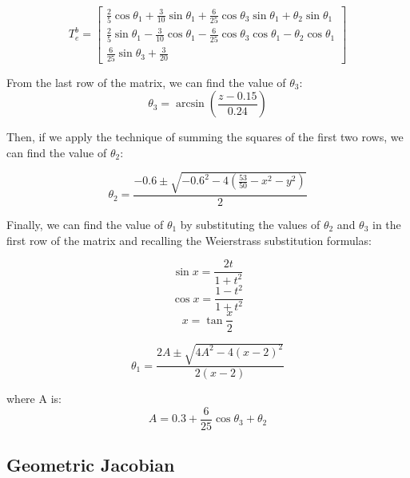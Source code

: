 \documentclass{article}
\begin{document}
\begin{equation}
    \renewcommand{\arraystretch}{1.5}
    T_e ^b =
    \begin{bmatrix}
        \frac{2}{5} \cos \theta_1 + \frac{3}{10} \sin \theta_1 + \frac{6}{25} \cos \theta_3 \sin \theta_1 + \theta_2 \sin \theta_1 \\
        \frac{2}{5} \sin \theta_1 - \frac{3}{10} \cos \theta_1 - \frac{6}{25} \cos \theta_3 \cos \theta_1 - \theta_2 \cos \theta_1 \\
        \frac{6}{25} \sin \theta_3 + \frac{3}{20}
    \end{bmatrix}
\end{equation}

From the last row of the matrix, we can find the value of $\theta_3$:
\begin{equation}
    \theta_3 = \arcsin \left( \frac{z-0.15}{0.24}\right)
\end{equation}

Then, if we apply the technique of summing the squares of the first two rows, we can find the value of $\theta_2$:


\begin{equation}
    \theta_2 = \frac{-0.6 \pm \sqrt{-0.6^2 - 4 (\frac{53}{50} - x^2 - y^2)}}{2}
\end{equation}

Finally, we can find the value of $\theta_1$ by substituting the values of $\theta_2$ and $\theta_3$ in the first row of the matrix and recalling the Weierstrass substitution formulas:

\begin{equation}
    \sin x = \frac{2t}{1+t^{2}}
\end{equation}
\begin{equation}
    \cos x = \frac{1-t^{2}}{1+t^{2}}
\end{equation}
\begin{equation}
    x = \tan \frac{x}{2}
\end{equation}

\begin{equation}
    \theta_1 = \frac{2A \pm \sqrt{4A^2 - 4 (x-2)^2}}{2 (x-2)}
\end{equation}

where A is:
\begin{equation}
    A = 0.3+\frac{6}{25} \cos \theta_3 + \theta_2
\end{equation}




\subsection{Geometric Jacobian}
\end{document}
